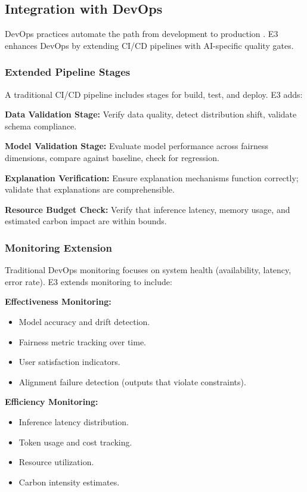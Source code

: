 \documentclass[11pt,a4paper]{article}
\begin{document}
\subsection{Integration with DevOps}

DevOps practices automate the path from development to production \cite{humble2010continuous}. E3 enhances DevOps by extending CI/CD pipelines with AI-specific quality gates.

\subsubsection{Extended Pipeline Stages}

A traditional CI/CD pipeline includes stages for build, test, and deploy. E3 adds:

\textbf{Data Validation Stage:} Verify data quality, detect distribution shift, validate schema compliance.

\textbf{Model Validation Stage:} Evaluate model performance across fairness dimensions, compare against baseline, check for regression.

\textbf{Explanation Verification:} Ensure explanation mechanisms function correctly; validate that explanations are comprehensible.

\textbf{Resource Budget Check:} Verify that inference latency, memory usage, and estimated carbon impact are within bounds.


\subsubsection{Monitoring Extension}

Traditional DevOps monitoring focuses on system health (availability, latency, error rate). E3 extends monitoring to include:

\textbf{Effectiveness Monitoring:}
\begin{itemize}[leftmargin=2em]
    \item Model accuracy and drift detection.
    \item Fairness metric tracking over time.
    \item User satisfaction indicators.
    \item Alignment failure detection (outputs that violate constraints).
\end{itemize}

\textbf{Efficiency Monitoring:}
\begin{itemize}[leftmargin=2em]
    \item Inference latency distribution.
    \item Token usage and cost tracking.
    \item Resource utilization.
    \item Carbon intensity estimates.
\end{itemize}
\end{document}
